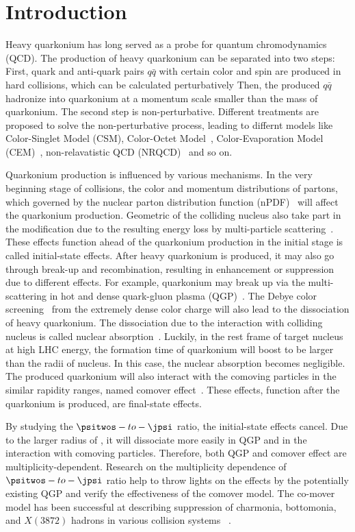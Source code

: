 \section{Introduction}
\label{sec:Introduction}
Heavy quarkonium has long served as a probe for quantum chromodynamics (QCD). The production of heavy quarkonium can be separated into two steps: First, quark and anti-quark pairs $q\bar{q}$ with certain color and spin are produced in hard collisions, which can be calculated perturbatively Then, the produced $q\bar{q}$ hadronize into quarkonium at a momentum scale smaller than the mass of quarkonium. The second step is non-perturbative. Different treatments are proposed to solve the non-perturbative process, leading to differnt models like Color-Singlet Model (CSM), Color-Octet Model~\cite{Bodwin:1992qr}, Color-Evaporation Model (CEM)~\cite{Halzen:1977rs}, non-relavatistic QCD (NRQCD)~\cite{Bodwin:1994jh} and so on. 

Quarkonium production is influenced by various mechanisms. In the very beginning stage of collisions, the color and momentum distributions of partons, which governed by the nuclear parton distribution function (nPDF)~\cite{AtashbarTehrani:2017mzi} will affect the quarkonium production. Geometric of the colliding nucleus also take part in the modification due to the resulting energy loss by multi-particle scattering~\cite{Arleo:2014oha}. These effects function ahead of the quarkonium production in the initial stage is called initial-state effects. After heavy quarkonium is produced, it may also go through break-up and recombination, resulting in enhancement or suppression due to different effects. For example, quarkonium may break up via the multi-scattering in hot and dense quark-gluon plasma (QGP)~\cite{Wu:2010ze}. The Debye color screening~\cite{Quigg:1979vr} from the extremely dense color charge will also lead to the dissociation of heavy quarkonium. The dissociation due to the interaction with colliding nucleus is called nuclear absorption~\cite{Gavin:1990gm}. Luckily, in the rest frame of target nucleus at high LHC energy, the formation time of
quarkonium will boost to be larger than the radii of nucleus. In this case, the nuclear absorption becomes negligible. The produced quarkonium will also interact with the comoving particles in the similar rapidity ranges, named comover effect~\cite{Ferreiro:2012rq}. These effects, function after the quarkonium is produced, are final-state effects. 

By studying the $\psitwos-to-\jpsi$ ratio, the initial-state effects cancel. Due to the larger radius of \psitwos, it will dissociate more easily in QGP and in the interaction with comoving particles. Therefore, both QGP and comover effect are multiplicity-dependent. Research on the multiplicity dependence of $\psitwos-to-\jpsi$ ratio help to throw lights on the effects by the potentially existing QGP and verify the effectiveness of the comover model. The co-mover model has been successful at describing suppression of charmonia, bottomonia, and $X(3872)$ hadrons in various collision systems ~\cite{Gavin:1996yd,Ferreiro:2018wbd,Esposito:2020ywk,Braaten:2020iqw}. 


